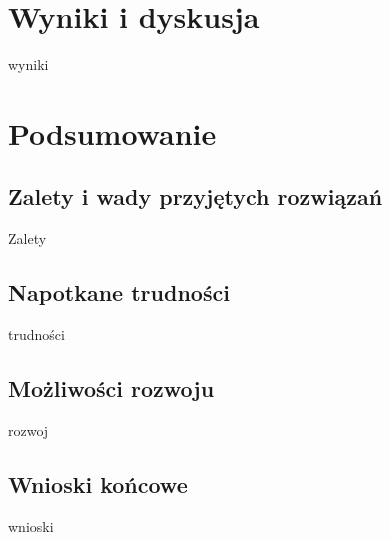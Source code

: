 \documentclass[12pt]{article}
\begin{document}
\begin{sloppypar}
\section{Wyniki i dyskusja}
{
  wyniki
}

\section{Podsumowanie}
{
  \subsection{Zalety i wady przyjętych rozwiązań}
  {
    Zalety
  }
  \subsection{Napotkane trudności}
  {
    trudności
  }
  \subsection{Możliwości rozwoju}
  {
    rozwoj
  }
  \subsection{Wnioski końcowe}
  {
    wnioski
  }
}

\clearpage
\printbibliography[
  heading=bibintoc,
  title={Bibliografia}
]

\clearpage
\listoffigures

\clearpage
\listoftables

\clearpage
{}
\lstlistoflistings

\end{sloppypar}
\end{document}
